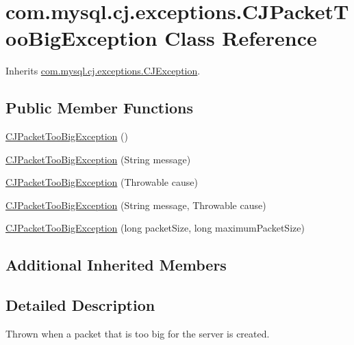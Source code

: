 \hypertarget{classcom_1_1mysql_1_1cj_1_1exceptions_1_1_c_j_packet_too_big_exception}{}\section{com.\+mysql.\+cj.\+exceptions.\+C\+J\+Packet\+Too\+Big\+Exception Class Reference}
\label{classcom_1_1mysql_1_1cj_1_1exceptions_1_1_c_j_packet_too_big_exception}


Inherits \mbox{\hyperlink{classcom_1_1mysql_1_1cj_1_1exceptions_1_1_c_j_exception}{com.\+mysql.\+cj.\+exceptions.\+C\+J\+Exception}}.

\subsection*{Public Member Functions}
\begin{DoxyCompactItemize}
\item 
\mbox{\hyperlink{classcom_1_1mysql_1_1cj_1_1exceptions_1_1_c_j_packet_too_big_exception_ae616761264ab9c8dbf4bf70bebe7420a}{C\+J\+Packet\+Too\+Big\+Exception}} ()
\item 
\mbox{\hyperlink{classcom_1_1mysql_1_1cj_1_1exceptions_1_1_c_j_packet_too_big_exception_afa8186c5a545288a9025379a016c198b}{C\+J\+Packet\+Too\+Big\+Exception}} (String message)
\item 
\mbox{\hyperlink{classcom_1_1mysql_1_1cj_1_1exceptions_1_1_c_j_packet_too_big_exception_a6c999dc0b91b9e456ce5b33d634ecd7b}{C\+J\+Packet\+Too\+Big\+Exception}} (Throwable cause)
\item 
\mbox{\hyperlink{classcom_1_1mysql_1_1cj_1_1exceptions_1_1_c_j_packet_too_big_exception_a825290fd8f75cca59f80b124464fb699}{C\+J\+Packet\+Too\+Big\+Exception}} (String message, Throwable cause)
\item 
\mbox{\hyperlink{classcom_1_1mysql_1_1cj_1_1exceptions_1_1_c_j_packet_too_big_exception_a2b7bde7117634bc639116d3977645c78}{C\+J\+Packet\+Too\+Big\+Exception}} (long packet\+Size, long maximum\+Packet\+Size)
\end{DoxyCompactItemize}
\subsection*{Additional Inherited Members}


\subsection{Detailed Description}
Thrown when a packet that is too big for the server is created. 

